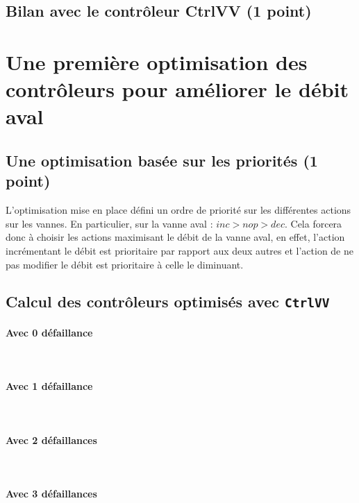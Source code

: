 \documentclass[a4paper]{book}
\begin{document}
\subsection{Bilan avec le contrôleur CtrlVV (1 point)}

\section{Une première optimisation des contrôleurs pour améliorer le débit aval}
\subsection{Une optimisation basée sur les priorités (1 point)}
\small{}
L'optimisation mise en place défini un ordre de priorité sur les différentes
actions sur les vannes. En particulier, sur la vanne aval : $inc > nop > dec$.
Cela forcera donc à choisir les actions maximisant le débit de la vanne aval,
en effet, l'action incrémentant le débit est prioritaire par rapport aux deux
autres et l'action de ne pas modifier le débit est prioritaire à celle le
diminuant.

\subsection{Calcul des contrôleurs optimisés avec {\tt CtrlVV}}
\paragraph{Avec 0 défaillance}\ \\


\paragraph{Avec 1 défaillance}\ \\


\paragraph{Avec 2 défaillances}\ \\


\paragraph{Avec 3 défaillances}\ \\

\end{document}
